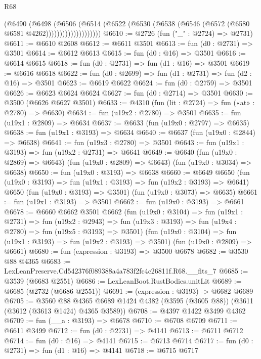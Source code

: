 \begin{lexlean}{R68}
\begin{coremodule}
                        (@6490
                          (@6498
                            (@6506
                              (@6514
                                (@6522
                                  (@6530 (@6538 (@6546 (@6572 (@6580 @6581 @4262))))))))))))))))))))
@6610 := @2726 (fun ("_" : @2724) => @2731)
@6611 := @6610 @2608
@6612 := @6611 @3501
@6613 := fun (d0 : @2731) => @3501
@6614 := @6612 @6613
@6615 := fun (d0 : @16) => @3501
@6616 := @6614 @6615
@6618 := fun (d0 : @2731) => fun (d1 : @16) => @3501
@6619 := @6616 @6618
@6622 := fun (d0 : @2699) => fun (d1 : @2731) => fun (d2 : @16) => @3501
@6623 := @6619 @6622
@6624 := fun (d0 : @2759) => @3501
@6626 := @6623 @6624 @6624
@6627 := fun (d0 : @2714) => @3501
@6630 := @3500 (@6626 @6627 @3501)
@6633 := @4310 (fun (lit : @2724) => fun («at» : @2780) => @6630)
@6634 := fun (u19x2 : @2780) => @3501
@6635 := fun (u19x1 : @2809) => @6634
@6637 := @6633 (fun (u19x0 : @2797) => @6635)
@6638 := fun (u19x1 : @3193) => @6634
@6640 := @6637 (fun (u19x0 : @2844) => @6638)
@6641 := fun (u19x3 : @2780) => @3501
@6643 := fun (u19x1 : @3193) => fun (u19x2 : @2731) => @6641
@6649 := @6640
    (fun (u19x0 : @2869) => @6643)
    (fun (u19x0 : @2809) => @6643)
    (fun (u19x0 : @3034) => @6638)
@6650 := fun (u19x0 : @3193) => @6638
@6660 := @6649
    @6650
    (fun (u19x0 : @3193) => fun (u19x1 : @3193) => fun (u19x2 : @3193) => @6641)
    @6650
    (fun (u19x0 : @3193) => @3501)
    (fun (u19x0 : @3073) => @6635)
@6661 := fun (u19x1 : @3193) => @3501
@6662 := fun (u19x0 : @3193) => @6661
@6678 := @6660
    @6662
    @3501
    @6662
    (fun (u19x0 : @3104) =>
    fun (u19x1 : @2731) =>
    fun (u19x2 : @2943) =>
    fun (u19x3 : @3193) => fun (u19x4 : @2780) => fun (u19x5 : @3193) => @3501)
    (fun (u19x0 : @3104) => fun (u19x1 : @3193) => fun (u19x2 : @3193) => @3501)
    (fun (u19x0 : @2809) => @6661)
@6680 := fun (expression : @3193) => @3500 @6678
@6682 := @3530 @88 @4365
@6683 := LexLeanPreserve.Cd542376f089388a4a783f2fc4c26811f.R68.__fits_7
@6685 := @3539 (@6683 @2551)
@6686 := LexLeanBoot.RustBodies.unitLit
@6689 := @6685 (@2732 (@6686 @2551))
@6691 := (expression : @3193) -> @6682 @6689
@6705 := @3560
    @88
    @4365
    @6689
    @1424
    @4382
    (@3595 (@3605 @88))
    (@3611 (@3612 (@3613 @1424) @4365 @3589))
@6708 := @4397 @1422 @3499 @4362
@6709 := fun (__a : @3193) => @6678
@6710 := @6708 @6709
@6711 := @6611 @3499
@6712 := fun (d0 : @2731) => @4141
@6713 := @6711 @6712
@6714 := fun (d0 : @16) => @4141
@6715 := @6713 @6714
@6717 := fun (d0 : @2731) => fun (d1 : @16) => @4141
@6718 := @6715 @6717

\end{coremodule}
\end{lexlean}
